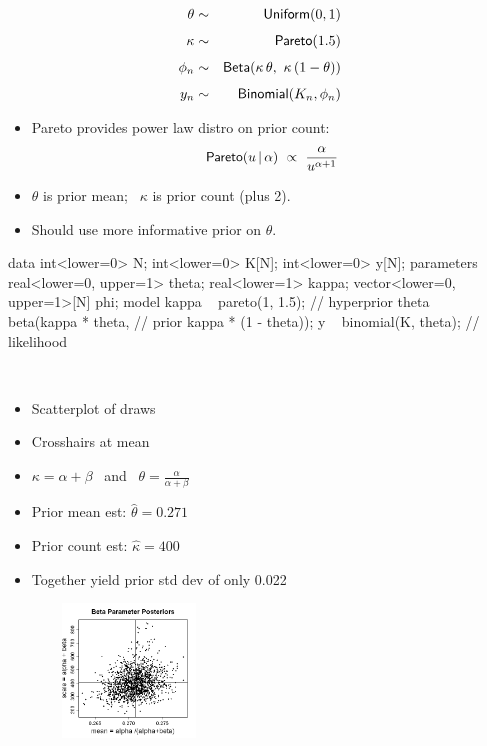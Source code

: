 \documentclass[10pt]{report}
\begin{document}
%
\begin{eqnarray*}
\theta &  \sim & \text{\sf Uniform}(0,1)
\\[4pt]
\kappa & \sim & \text{\sf Pareto}(1.5)
\\[4pt]
\phi_n & \sim & \text{\sf Beta}(\kappa \, \theta, \ \kappa \, (1 - \theta))
\\[4pt]
y_n & \sim & \text{\sf Binomial}(K_n, \phi_n)
\end{eqnarray*}
\begin{itemize}
\item Pareto provides power law distro on prior count:
{\small
\[
\text{\sf Pareto}(u \, | \, \alpha)
\ \propto \
\frac{\alpha}
     {u^{\alpha + 1}}
\]
}
\item $\theta$ is prior mean; \ $\kappa$ is prior count (plus 2).
\item Should use more informative prior on $\theta$.
\end{itemize}


%
\begin{stancode}
data {
  int<lower=0> N;
  int<lower=0> K[N];
  int<lower=0> y[N];
}
parameters {
  real<lower=0, upper=1> theta;
  real<lower=1> kappa;
  vector<lower=0, upper=1>[N] phi;
}
model {
  kappa ~ pareto(1, 1.5);             // hyperprior
  theta ~ beta(kappa * theta,         // prior
               kappa * (1 - theta));
  y ~ binomial(K, theta);             // likelihood
}
\end{stancode}


%
\\[8pt]
\begin{minipage}[t]{0.55\textwidth}
\begin{itemize}
\item Scatterplot of draws
\item Crosshairs at mean
\item $\kappa = \alpha +
  \beta$ \ and \ $\theta = \frac{\alpha}{\alpha + \beta}$
\item Prior mean est: $\hat{\theta} = 0.271$
\item Prior count est: $\hat{\kappa} = 400$
\item Together yield prior std dev of only 0.022
\end{itemize}
\end{minipage}
\begin{minipage}[t]{0.45\textwidth}
\vfill
\mbox{ } \ \ \ \ \ \ \includegraphics[height=1.4in]{img/baseball-beta-posterior-scatter.png}
\vfill
\end{minipage}
\end{document}
